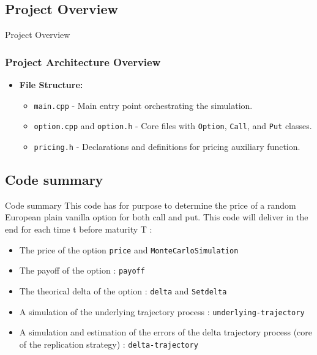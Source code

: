 \documentclass{beamer}
\begin{document}
\subsection{Project Overview}
\begin{frame}{Project Overview}
  \frametitle{Project Architecture Overview}

  \begin{itemize}
    \item \textbf{File Structure:}
      \begin{itemize}
        \item \texttt{main.cpp} - Main entry point orchestrating the simulation.
        \item \texttt{option.cpp} and \texttt{option.h} - Core files with \texttt{Option}, \texttt{Call}, and \texttt{Put} classes.
        \item \texttt{pricing.h} - Declarations and definitions for pricing auxiliary function.
      \end{itemize}
  \end{itemize}

\end{frame}
\subsection{Code summary}
\begin{frame}{Code summary}
This code has for purpose to determine the price of a random European plain vanilla option for both call and put. This code will deliver in the end for each time t before maturity T :
    \begin{itemize}
        \item 
            The price of the option \texttt{price} and \texttt{MonteCarloSimulation}
    
        \item 
            The payoff of the option : \texttt{payoff}
    
        \item 
            The theorical delta of the option : \texttt{delta} and \texttt{Setdelta}
            
    
        \item 
            A simulation of the underlying trajectory process : \texttt{underlying-trajectory}
           
        \item 
            A simulation and estimation of the errors of the delta trajectory process (core of the replication strategy) : \texttt{delta-trajectory}
    \end{itemize}
    
\end{frame}
\end{document}
